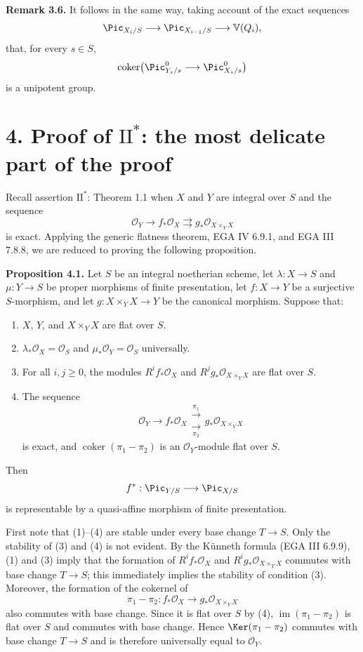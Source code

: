 \textbf{Remark 3.6.} It follows in the same way, taking account of the exact
sequences
\[
  \Pic_{X_i/S}\longrightarrow\Pic_{X_{i-1}/S}
  \longrightarrow\mathbb V(Q_i),
\]
that, for every $s\in S$,
\[
  \operatorname{coker}\bigl(
    \Pic^0_{Y_s/s}\longrightarrow\Pic^0_{X_s/s}
  \bigr)
\]
is a unipotent group.

\section*{4. Proof of $\mathrm{II}^*$: the most delicate part of the proof}

Recall assertion $\mathrm{II}^*$: Theorem 1.1 when $X$ and $Y$ are integral
over $S$ and the sequence
\[
  \mathcal O_Y\longrightarrow f_*\mathcal O_X
  \rightrightarrows g_*\mathcal O_{X\times_YX}
\]
is exact. Applying the generic flatness theorem, EGA IV 6.9.1, and EGA III
7.8.8, we are reduced to proving the following proposition.

\textbf{Proposition 4.1.} Let $S$ be an integral noetherian scheme, let
$\lambda:X\to S$ and $\mu:Y\to S$ be proper morphisms of finite
presentation, let $f:X\to Y$ be a surjective $S$-morphism, and let
$g:X\times_YX\to Y$ be the canonical morphism. Suppose that:
\begin{enumerate}[label=\arabic*)]
\item $X$, $Y$, and $X\times_YX$ are flat over $S$.
\item $\lambda_*\mathcal O_X=\mathcal O_S$ and
  $\mu_*\mathcal O_Y=\mathcal O_S$ universally.

\item For all $i,j\geq0$, the modules $R^if_*\mathcal O_X$ and
  $R^jg_*\mathcal O_{X\times_YX}$ are flat over $S$.
\item The sequence
  \begin{equation}\tag{*}
    \mathcal O_Y\longrightarrow f_*\mathcal O_X
    \mathrel{\substack{\xrightarrow{\pi_1}\\[-0.7ex]
                       \xrightarrow[\pi_2]{}}}
    g_*\mathcal O_{X\times_YX}
  \end{equation}
  is exact, and $\operatorname{coker}(\pi_1-\pi_2)$ is an
  $\mathcal O_Y$-module flat over $S$.
\end{enumerate}
Then
\[
  f^*:\Pic_{Y/S}\longrightarrow\Pic_{X/S}
\]
is representable by a quasi-affine morphism of finite presentation.

First note that (1)--(4) are stable under every base change $T\to S$. Only
the stability of (3) and (4) is not evident. By the K\"unneth formula (EGA III
6.9.9), (1) and (3) imply that the formation of $R^if_*\mathcal O_X$ and
$R^ig_*\mathcal O_{X\times_YX}$ commutes with base change $T\to S$; this
immediately implies the stability of condition (3). Moreover, the formation
of the cokernel of
\[
  \pi_1-\pi_2:f_*\mathcal O_X
  \longrightarrow g_*\mathcal O_{X\times_YX}
\]
also commutes with base change. Since it is flat over $S$ by (4),
$\operatorname{im}(\pi_1-\pi_2)$ is flat over $S$ and commutes with base
change. Hence $\Ker(\pi_1-\pi_2)$ commutes with base change $T\to S$ and is
therefore universally equal to $\mathcal O_Y$.

